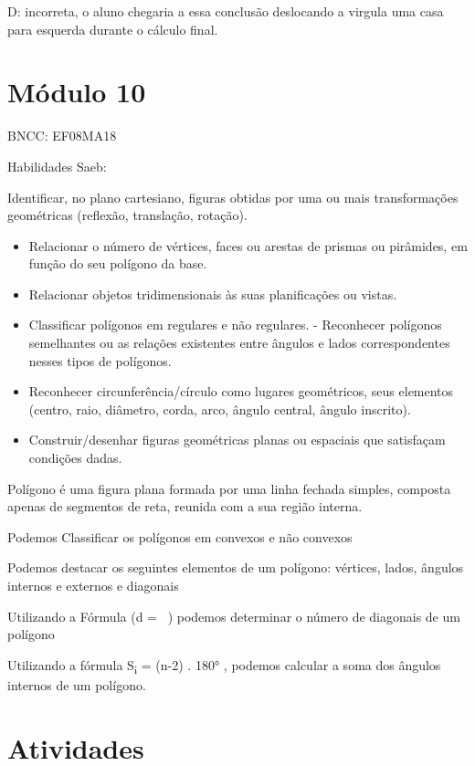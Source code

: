 D: incorreta, o aluno chegaria a essa conclusão deslocando a virgula uma
casa para esquerda durante o cálculo final.

\section{Módulo 10}

BNCC: EF08MA18

Habilidades Saeb:

Identificar, no plano cartesiano, figuras obtidas por uma ou mais
transformações geométricas (reflexão, translação, rotação).

\begin{itemize}
\item
  Relacionar o número de vértices, faces ou arestas de prismas ou
  pirâmides, em função do seu polígono da base.
\item
  Relacionar objetos tridimensionais às suas planificações ou vistas.
\item
  Classificar polígonos em regulares e não regulares. - Reconhecer
  polígonos semelhantes ou as relações existentes entre ângulos e lados
  correspondentes nesses tipos de polígonos.
\item
  Reconhecer circunferência/círculo como lugares geométricos, seus
  elementos (centro, raio, diâmetro, corda, arco, ângulo central, ângulo
  inscrito).
\item
  Construir/desenhar figuras geométricas planas ou espaciais que
  satisfaçam condições dadas.
\end{itemize}

Polígono é uma figura plana formada por uma linha fechada simples,
composta apenas de segmentos de reta, reunida com a sua região interna.

Podemos Classificar os polígonos em convexos e não convexos

Podemos destacar os seguintes elementos de um polígono: vértices, lados,
ângulos internos e externos e diagonais

Utilizando a Fórmula (d = \ ) podemos determinar o
número de diagonais de um polígono

Utilizando a fórmula S\textsubscript{i} = (n-2) . 180° , podemos
calcular a soma dos ângulos internos de um polígono.

\section{Atividades}

